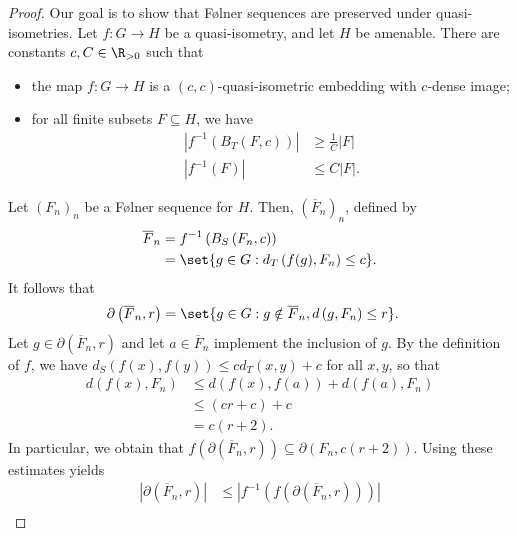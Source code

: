 \documentclass[10pt]{mypackage}
\begin{document}
\begin{proof}
  Our goal is to show that Følner sequences are preserved under quasi-isometries. Let $f\colon G\to H$ be a quasi-isometry, and let $H$ be amenable. There are constants $c,C\in \R_{> 0}$ such that
  \begin{itemize}
    \item the map $f\colon G\to H$ is a $\left( c,c \right)$-quasi-isometric embedding with $c$-dense image;
    \item for all finite subsets $F\subseteq H$, we have
      \begin{align*}
        \left\vert f^{-1}\left( B_{T}\left( F,c \right) \right) \right\vert &\geq \frac{1}{C}\left\vert F \right\vert\\
        \left\vert f^{-1}\left( F \right) \right\vert &\leq C \left\vert F \right\vert.
      \end{align*}
  \end{itemize}
  Let $\left( F_n \right)_n$ be a Følner sequence for $H$. Then, $\left( \overline{F}_n \right)_{n}$, defined by
  \begin{align*}
    \overline{F}_n &= f^{-1}\left( B_S\left( F_n,c \right) \right)\\
                   &= \set{g\in G : d_T\left( f(g),F_n \right)\leq c}.
  \end{align*}
  It follows that
  \begin{align*}
    \partial\left( \overline{F}_n,r \right) &= \set{g\in G : g\notin \overline{F}_n, d\left( g,F_n \right)\leq r}.
  \end{align*}
  Let $g\in \partial\left( \overline{F}_n,r \right)$ and let $a\in \overline{F}_n$ implement the inclusion of $g$. By the definition of $f$, we have $d_S\left( f(x),f(y) \right)\leq cd_T\left( x,y \right) + c$ for all $x,y$, so that
  \begin{align*}
    d\left( f(x),F_n \right) &\leq d\left( f(x),f(a) \right) + d\left( f(a),F_n \right)\\
                             &\leq \left( cr + c \right) + c\\
                             &= c\left( r + 2 \right).
  \end{align*}
  In particular, we obtain that $f\left( \partial\left( \overline{F}_n,r \right) \right)\subseteq \partial\left( F_n,c\left( r+2 \right) \right)$. Using these estimates yields
  \begin{align*}
    \left\vert \partial\left( \overline{F}_n,r \right) \right\vert &\leq \left\vert f^{-1}\left( f\left( \partial\left( \overline{F}_n,r \right) \right) \right) \right\vert\\

\end{align*}
\end{proof}
\end{document}
